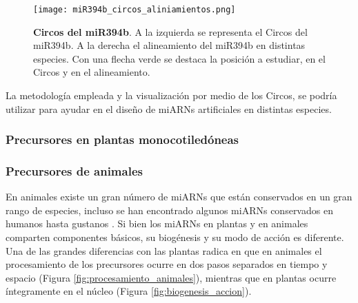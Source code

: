 \begin{figure}[htbp!] 
	\centering    
	\texttt{[image: miR394b\_circos\_aliniamientos.png]}
	\caption[Circos del miR394b]{
		\textbf{Circos del miR394b}.
		A la izquierda se representa el Circos del miR394b.
		A la derecha el alineamiento del miR394b en distintas especies. 
		Con una flecha verde se destaca la posición a estudiar, en el Circos y en el alineamiento.
	}
	\label{fig:miR394b_circos_aliniamientos}
\end{figure}

La metodología empleada y la visualización por medio de los Circos, se podría utilizar para ayudar en el diseño de miARNs artificiales en distintas especies.


\subsubsection{Precursores en plantas monocotiledóneas}


\subsubsection{Precursores de animales}

En animales existe un gran número de miARNs que están conservados en un gran rango de especies, incluso se han encontrado algunos miARNs conservados en humanos hasta gustanos \citep{pmid11081512}.
Si bien los miARNs en plantas y en animales comparten componentes básicos, su biogénesis y su modo de acción es diferente.
Una de las grandes diferencias con las plantas radica en que en animales el procesamiento de los precursores ocurre en dos pasos separados
en tiempo y espacio (Figura \ref{fig:procesamiento_animales}), mientras que en plantas ocurre íntegramente en el núcleo (Figura \ref{fig:biogenesis_accion}).

